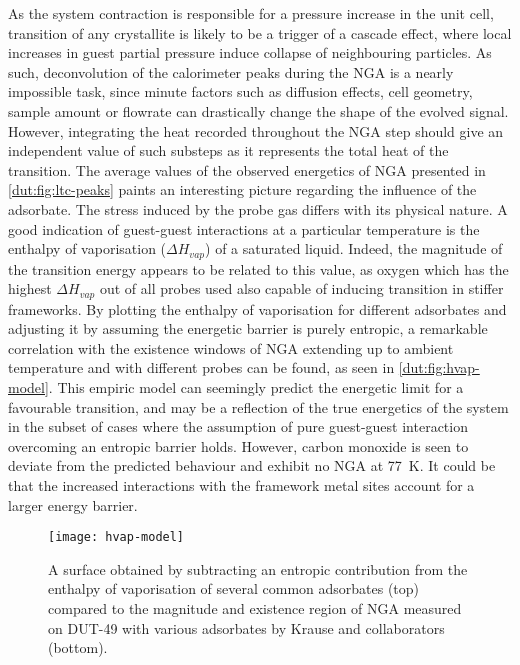 As the system contraction is responsible for a pressure increase
in the unit cell, transition of any crystallite is likely to be a
trigger of a cascade effect, where local increases in guest partial 
pressure induce collapse of neighbouring particles. As such,
deconvolution of the calorimeter peaks during the NGA is a nearly 
impossible task, since minute factors such as diffusion effects,
cell geometry, sample amount or flowrate can drastically change 
the shape of the evolved signal. However, integrating the heat 
recorded throughout the NGA step should give an independent value of such
substeps as it represents the total heat of the transition. 
The average values of the observed energetics of 
NGA presented in \autoref{dut:fig:ltc-peaks} paints an interesting
picture regarding the influence of the adsorbate.
The stress induced by the probe gas differs with its physical
nature. A good indication of guest-guest interactions at 
a particular temperature is the enthalpy of vaporisation 
(\(\Delta H_{vap}\)) of a saturated liquid. Indeed, the magnitude
of the transition energy appears to be related to this value, as
oxygen which has the highest \(\Delta H_{vap}\) out of all probes 
used also capable of inducing transition in stiffer frameworks. By
plotting the enthalpy of vaporisation for different adsorbates
and adjusting it by assuming the energetic barrier is purely 
entropic, a remarkable correlation with the existence windows
of NGA extending up to ambient temperature and with different probes
can be found, as seen in \autoref{dut:fig:hvap-model}.
This empiric model can seemingly predict the energetic limit
for a favourable transition, and may be a reflection of the 
true energetics of the system in the subset of cases where the 
assumption of pure guest-guest interaction overcoming an entropic
barrier holds. However, carbon monoxide is seen to deviate from
the predicted behaviour and exhibit no NGA at \SI{77}{\kelvin}. 
It could be that the increased interactions with the framework metal
sites account for a larger energy barrier.

\begin{figure}[htb]
    \centering
    \texttt{[image: hvap-model]}%
    \caption{
        A surface obtained by subtracting an entropic 
        contribution from the enthalpy of vaporisation of 
        several common adsorbates (top) compared to the 
        magnitude and existence region of NGA measured on 
        DUT-49 with various adsorbates by Krause and 
        collaborators (bottom).
    }\label{dut:fig:hvap-model}
\end{figure}

